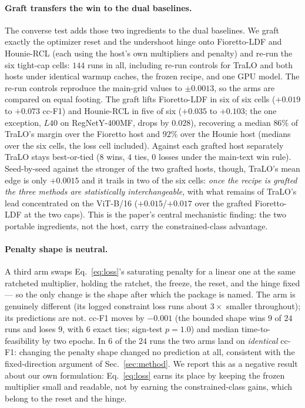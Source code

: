 \documentclass[10pt]{article}
\begin{document}
\paragraph{Graft transfers the win to the dual baselines.}
The converse test adds those two ingredients to the dual baselines. We
graft exactly the optimizer reset and the undershoot hinge onto
Fioretto-LDF and Hounie-RCL (each using the host's own multipliers and
penalty) and re-run the six tight-cap cells: $144$ runs in all, including
re-run controls for TraLO and both hosts under identical warmup caches,
the frozen recipe, and one GPU model. The re-run controls reproduce the
main-grid values to $\pm0.0013$, so the arms are compared on equal
footing. The graft lifts Fioretto-LDF in six of six cells ($+0.019$ to
$+0.073$ cc-F1) and Hounie-RCL in five of six ($+0.035$ to $+0.103$; the
one exception, $L40$ on RegNet{\color{blue}Y-400MF}, drops by $0.028$), recovering a median
$86\%$ of TraLO's margin over the Fioretto host and $92\%$ over the
Hounie host (medians over the six cells, the loss cell included). Against
each grafted host separately TraLO stays best-or-tied ($8$ wins, $4$
ties, $0$ losses under the main-text win rule). Seed-by-seed against the
stronger of the two grafted hosts, though, TraLO's mean edge is only
$+0.0015$ and it trails in two of the six cells: \emph{once the recipe is
grafted the three methods are statistically interchangeable}, with what
remains of TraLO's lead concentrated on the ViT-B/16 ($+0.015$/$+0.017$
over the grafted Fioretto-LDF at the two caps). This is the paper's
central mechanistic finding: the two portable ingredients, not the host,
carry the constrained-class advantage.

\paragraph{Penalty shape is neutral.}
A third arm swaps Eq.~\eqref{eq:loss}'s saturating penalty for a linear
one at the same ratcheted multiplier, holding the ratchet, the freeze,
the reset, and the hinge fixed --- so the only change is the shape after
which the package is named. The arm is genuinely different (its logged
constraint loss runs about $3\times$ smaller throughout); its
predictions are not. cc-F1 moves by $-0.001$ (the bounded shape wins $9$
of $24$ runs and loses $9$, with $6$ exact ties; sign-test $p{=}1.0$)
and median time-to-feasibility by two epochs. In $6$ of the $24$ runs the
two arms land on \emph{identical} cc-F1: changing the penalty shape
changed no prediction at all, consistent with the fixed-direction
argument of Sec.~\ref{sec:method}. We report this as a negative result
about our own formulation: Eq.~\eqref{eq:loss} earns its place by keeping
the frozen multiplier small and readable, not by earning the
constrained-class gains, which belong to the reset and the hinge.
\end{document}
